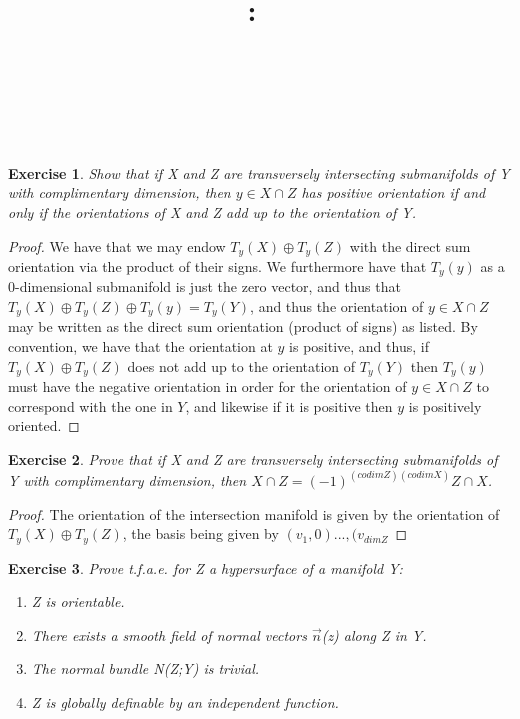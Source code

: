 \documentclass{article}
\title{
    \vspace{2in}
    \textmd{\textbf{\hmwkClass:\ \hmwkTitle}}\\
    \vspace{0.1in}
    \textmd{\hmwkDueDate} \\
    \vspace{0.2in}\large{\textit{\hmwkClassInstructor\  }}
    \vspace{2in}
}
\author{\hmwkAuthorName}
\date{}
\newtheorem{exercise}{Exercise}
\begin{document}
\maketitle

\pagebreak

\begin{exercise}
  Show that if X and Z are transversely intersecting submanifolds of Y with complimentary dimension, then $y \in X \cap Z$ has positive orientation if and only if the orientations of X and Z add up to the orientation of Y. 
\end{exercise}

\begin{proof}
  We have that we may endow $T_{y}(X) \oplus T_{y}(Z)$ with the direct sum orientation via the product of their signs. We furthermore have that $T_{y}(y)$ as a 0-dimensional submanifold is just the zero vector, and thus that $T_{y}(X) \oplus T_{y}(Z) \oplus T_{y}(y) = T_{y}(Y)$, and thus the orientation of $y \in X \cap Z$ may be written as the direct sum orientation (product of signs) as listed. By convention, we have that the orientation at $y$ is positive, and thus, if $T_{y}(X) \oplus T_{y}(Z)$ does not add up to the orientation of $T_{y}(Y)$ then $T_{y}(y)$ must have the negative orientation in order for the orientation of $y \in X \cap Z$ to correspond with the one in $Y$, and likewise if it is positive then $y$ is positively oriented.  
\end{proof}

\begin{exercise}
Prove that if X and Z are transversely intersecting submanifolds of Y with complimentary dimension, then $X \cap Z = (-1)^{(codimZ)(codimX)} Z \cap X$.   
\end{exercise}

\begin{proof}
  The orientation of the intersection manifold is given by the orientation of $T_{y}(X) \oplus T_{y}(Z)$, the basis being given by $(v_{1},0)...,(v_{dimZ}$
\end{proof}

\begin{exercise}
  Prove t.f.a.e. for Z a hypersurface of a manifold Y:
  \begin{enumerate}
  \item Z is orientable.
  \item There exists a smooth field of normal vectors $\vec{n}$(z) along Z in Y.
  \item The normal bundle N(Z;Y) is trivial.
  \item Z is globally definable by an independent function.
  \end{enumerate}
\end{exercise}
\end{document}
